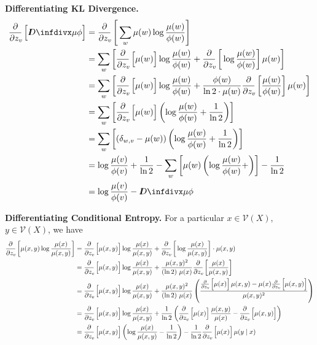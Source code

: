 \documentclass{article}
\newcommand{\V}{\mathcal V}
\begin{document}
	\textbf{Differentiating KL Divergence.}
	\begin{align*}
		\pz{\kldiv{\mu}{\phi}} &= \pz{\sum_w \mu(w) \log \frac{\mu(w)}{\phi(w)}} \\
			&= \sum_w \left[ \pz{\mu(w)} \log \frac{\mu(w)}{\phi(w)} + \pz{\log\frac{\mu(w)}{\phi(w)} }\mu(w) \right] \\
			&=\sum_w \left[ \pz{\mu(w)} \log \frac{\mu(w)}{\phi(w)} + \frac{\phi(w)}{\ln 2\cdot\mu(w)} \pz{\frac{\mu(w)}{\phi(w)}} \mu(w) \right] \\
			&=\sum_w \left[ \pz{\mu(w)} \left(\log \frac{\mu(w)}{\phi(w)} + \frac{1}{\ln 2} \right) \right] \\
			&=\sum_w \left[ (\delta_{w,v} - \mu(w)) \left(\log \frac{\mu(w)}{\phi(w)} + \frac{1}{\ln 2} \right) \right] \\
			&= \log \frac{\mu(v)}{\phi(v)} + \frac{1}{\ln 2} - \sum_w \left[ \mu(w) \left(\log \frac{\mu(w)}{\phi(w)} +  \right) \right] - \frac{1}{\ln 2} \\
			&= \log \frac{\mu(v)}{\phi(v)} - \kldiv{\mu}{\phi} \\
	\end{align*}
	
	\textbf{Differentiating Conditional Entropy.}
	For a particular $x \in \V(X)$, $y \in \V(X)$, we have
	\begin{align*}
		\pz{\mu(x,y) \log \frac{\mu(x)}{\mu(x,y)}}
		&= \pz{\mu(x,y)} \log \frac{\mu(x)}{\mu(x,y)} + \pz{\log \frac{\mu(x)}{\mu(x,y)}} \cdot \mu(x,y) \\
		&= \pz{\mu(x,y)} \log \frac{\mu(x)}{\mu(x,y)} + \frac{\mu(x,y)^2}{(\ln 2)\ \mu(x) } \pz{\frac{\mu(x)}{\mu(x,y)}} \\
		&= \pz{\mu(x,y)} \log \frac{\mu(x)}{\mu(x,y)} + \frac{\mu(x,y)^2}{(\ln 2)\ \mu(x) } \left(\frac{ \pz{\mu(x)} \mu(x,y) - \mu(x) \pz{\mu(x,y)}}{\mu(x,y)^2} \right) \\
		&= \pz{\mu(x,y)} \log \frac{\mu(x)}{\mu(x,y)} + \frac{1}{\ln 2} \left( \pz{\mu(x)} \frac{\mu(x,y)}{\mu(x)} - \pz{\mu(x,y)} \right) \\
		&= \pz{\mu(x,y)} \left(\log \frac{\mu(x)}{\mu(x,y)} - \frac{1}{\ln 2}\right) -  \frac{1}{\ln 2} \pz{\mu(x)} \mu(y \mid x) \\
	\end{align*}
	
\end{document}

